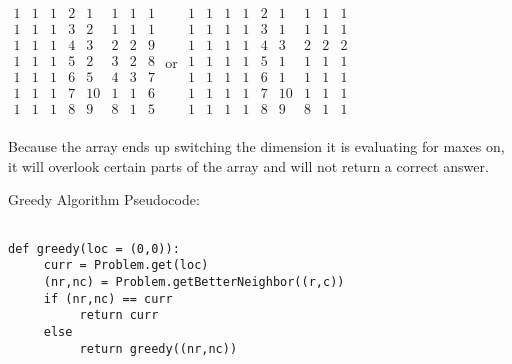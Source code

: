 \documentclass[12pt,twoside]{article}
\begin{document}
\begin{problems}
\begin{problemparts}
\begin{center} 
$\begin{array}{ccccccccc}
1&1&1&2&1&1&1&1\\1&1&1&3&2&1&1&1\\1&1&1&4&3&2&2&9\\1&1&1&5&2&3&2&8\\1&1&1&6&5&4&3&7\\1&1&1&7&10&1&1&6\\1&1&1&8&9&8&1&5\\
\end{array} $
or 
$\begin{array}{ccccccccc}
1&1&1&1&2&1&1&1&1\\1&1&1&1&3&1&1&1&1\\1&1&1&1&4&3&2&2&2\\1&1&1&1&5&1&1&1&1\\1&1&1&1&6&1&1&1&1\\1&1&1&1&7&10&1&1&1\\1&1&1&1&8&9&8&1&1\\
\end{array} $

\end {center} 
Because the array ends up switching the dimension it is evaluating for maxes on, it will overlook certain parts of the array and will not return a correct answer.
\end{problemparts}
\problem
\begin{problemparts}
\problempart Greedy Algorithm Pseudocode:
\begin{verbatim}

def greedy(loc = (0,0)):
     curr = Problem.get(loc)
     (nr,nc) = Problem.getBetterNeighbor((r,c))
     if (nr,nc) == curr
          return curr
     else
          return greedy((nr,nc))


\end{verbatim}
\end{problemparts}
\end{problems}
\end{document}
